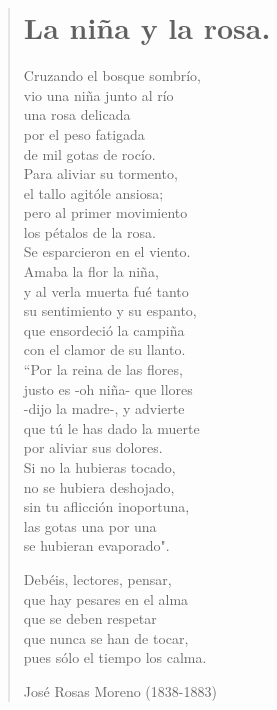 \documentclass[12pt, twoside]{book}
\begin{document}
\newpage
\begin{verse}
\begin{center}
\section{La niña y la rosa.}
\end{center}
Cruzando el bosque sombrío,\\
vio una niña junto al río\\
una rosa delicada\\
por el peso fatigada\\
de mil gotas de rocío.\\
Para aliviar su tormento,\\
el tallo agitóle ansiosa;\\
pero al primer movimiento\\
los pétalos de la rosa.\\
Se esparcieron en el viento.\\
Amaba la flor la niña,\\
y al verla muerta fué tanto\\
su sentimiento y su espanto,\\
que ensordeció la campiña\\
con el clamor de su llanto.\\
``Por la reina de las flores,\\
justo es -oh niña- que llores\\
-dijo la madre-, y advierte\\
que tú le has dado la muerte\\
por aliviar sus dolores.\\
Si no la hubieras tocado,\\
no se hubiera deshojado,\\
sin tu aflicción inoportuna,\\
las gotas una por una\\
se hubieran evaporado".
\newline
 
Debéis, lectores, pensar,\\
que hay pesares en el alma\\
que se deben respetar\\
que nunca se han de tocar,\\
pues sólo el tiempo los calma.
\newline
 
José Rosas Moreno (1838-1883)

\end{verse}
\end{document}
